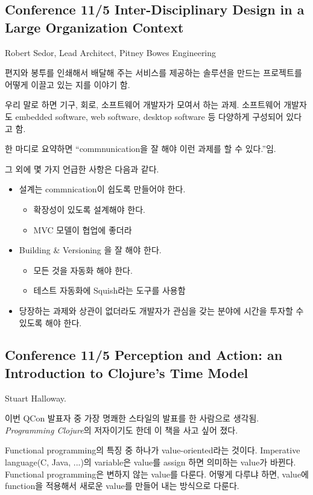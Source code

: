 \documentclass[a4paper]{article}
\begin{document}
\subsection{Conference 11/5 Inter-Disciplinary Design in a Large
  Organization Context}
 
Robert Sedor, Lead Architect, Pitney Bowes Engineering
 
편지와 봉투를 인쇄해서 배달해 주는 서비스를 제공하는 솔루션을 만드는
프로젝트를 어떻게 이끌고 있는 지를 이야기 함.
 
우리 말로 하면 기구, 회로, 소프트웨어 개발자가 모여서 하는
과제. 소프트웨어 개발자도 embedded software, web software, desktop
software 등 다양하게 구성되어 있다고 함.
 
한 마디로 요약하면 ``commnunication을 잘 해야 이런 과제를 할 수 있다.''임.
 
그 외에 몇 가지 언급한 사항은 다음과 같다.
\begin{itemize}
\item 설계는 commnication이 쉽도록 만들어야 한다.
    \begin{itemize}
    \item 확장성이 있도록 설계해야 한다.
    \item MVC 모델이 협업에 좋더라
    \end{itemize}
\item Building \& Versioning 을 잘 해야 한다.
    \begin{itemize}
    \item 모든 것을 자동화 해야 한다.
    \item 테스트 자동화에 Squish라는 도구를 사용함
    \end{itemize}
\item 당장하는 과제와 상관이 없더라도 개발자가 관심을 갖는 분야에 시간을 투자할 수 있도록 해야 한다.
\end{itemize}
 
\subsection{Conference 11/5 Perception and Action: an Introduction to
  Clojure's Time Model}
 
Stuart Halloway.
 
이번 QCon 발표자 중 가장 명쾌한 스타일의 발표를 한 사람으로
생각됨. \textit{Programming Clojure}의 저자이기도 한데 이 책을 사고 싶어
졌다.
 
Functional programming의 특징 중 하나가 value-oriented라는
것이다. Imperative language(C, Java, ...)의 variable은 value를 assign
하면 의미하는 value가 바뀐다. Functional programming은 변하지 않는
value를 다룬다. 어떻게 다루냐 하면, value에 function을 적용해서 새로운
value를 만들어 내는 방식으로 다룬다.
 
\end{document}
